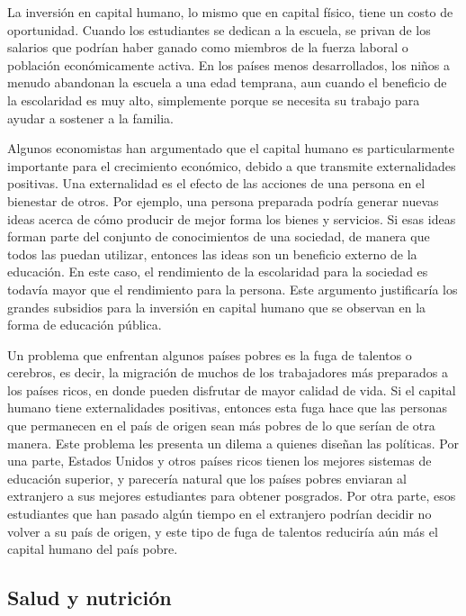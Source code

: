 \documentclass[
]{krantz}
\begin{document}
La inversión en capital humano, lo mismo que en capital físico, tiene un costo de oportunidad. Cuando los estudiantes se dedican a la escuela, se privan de los salarios que podrían haber ganado como miembros de la fuerza laboral o población económicamente activa. En los países menos desarrollados, los niños a menudo abandonan la escuela a una edad temprana, aun cuando el beneficio de la escolaridad es muy alto, simplemente porque se necesita su trabajo para ayudar a sostener a la familia.

Algunos economistas han argumentado que el capital humano es particularmente importante para el crecimiento económico, debido a que transmite externalidades positivas. Una externalidad es el efecto de las acciones de una persona en el bienestar de otros. Por ejemplo, una persona preparada podría generar nuevas ideas acerca de cómo producir de mejor forma los bienes y servicios. Si esas ideas forman parte del conjunto de conocimientos de una sociedad, de manera que todos las puedan utilizar, entonces las ideas son un beneficio externo de la educación. En este caso, el rendimiento de la escolaridad para la sociedad es todavía mayor que el rendimiento para la persona. Este argumento justificaría los grandes subsidios para la inversión en capital humano que se observan en la forma de educación pública.

Un problema que enfrentan algunos países pobres es la fuga de talentos o cerebros, es decir, la migración de muchos de los trabajadores más preparados a los países ricos, en donde pueden disfrutar de mayor calidad de vida. Si el capital humano tiene externalidades positivas, entonces esta fuga hace que las personas que permanecen en el país de origen sean más pobres de lo que serían de otra manera. Este problema les presenta un dilema a quienes diseñan las políticas. Por una parte, Estados Unidos y otros países ricos tienen los mejores sistemas de educación superior, y parecería natural que los países pobres enviaran al extranjero a sus mejores estudiantes para obtener posgrados. Por otra parte, esos estudiantes que han pasado algún tiempo en el extranjero podrían decidir no volver a su país de origen, y este tipo de fuga de talentos reduciría aún más el capital humano del país pobre.

\hypertarget{salud-y-nutriciuxf3n}{%
\subsection{Salud y nutrición}\label{salud-y-nutriciuxf3n}}
\end{document}

